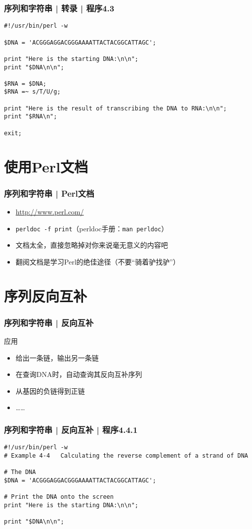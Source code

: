 \begin{frame}[fragile]
  \frametitle{序列和字符串 | 转录 | \alert{程序4.3}}
\begin{lstlisting}
#!/usr/bin/perl -w

$DNA = 'ACGGGAGGACGGGAAAATTACTACGGCATTAGC';

print "Here is the starting DNA:\n\n";
print "$DNA\n\n";

$RNA = $DNA;
$RNA =~ s/T/U/g;

print "Here is the result of transcribing the DNA to RNA:\n\n";
print "$RNA\n";

exit;
\end{lstlisting}
\end{frame}


\section{使用Perl文档}
\begin{frame}[fragile]
  \frametitle{序列和字符串 | \alert{Perl文档}}
  \begin{itemize}
    \item \href{http://www.perl.com/}{http://www.perl.com/} 
    \item \verb|perldoc -f print|（perldoc手册：\verb|man perldoc|）
    \item 文档太全，直接忽略掉对你来说毫无意义的内容吧
    \item 翻阅文档是学习Perl的绝佳途径（不要“骑着驴找驴”）
  \end{itemize}
\end{frame}

\section{序列反向互补}
\begin{frame}
  \frametitle{序列和字符串 | 反向互补}
  \begin{block}{应用}
    \begin{itemize}
      \item 给出一条链，输出另一条链
      \item 在查询DNA时，自动查询其反向互补序列
      \item 从基因的负链得到正链
      \item ……
    \end{itemize}
  \end{block}
\end{frame}

\begin{frame}[fragile]
  \frametitle{序列和字符串 | 反向互补 | 程序4.4.1}
\begin{lstlisting}
#!/usr/bin/perl -w
# Example 4-4   Calculating the reverse complement of a strand of DNA

# The DNA
$DNA = 'ACGGGAGGACGGGAAAATTACTACGGCATTAGC';

# Print the DNA onto the screen
print "Here is the starting DNA:\n\n";

print "$DNA\n\n";
\end{lstlisting}
\end{frame}

